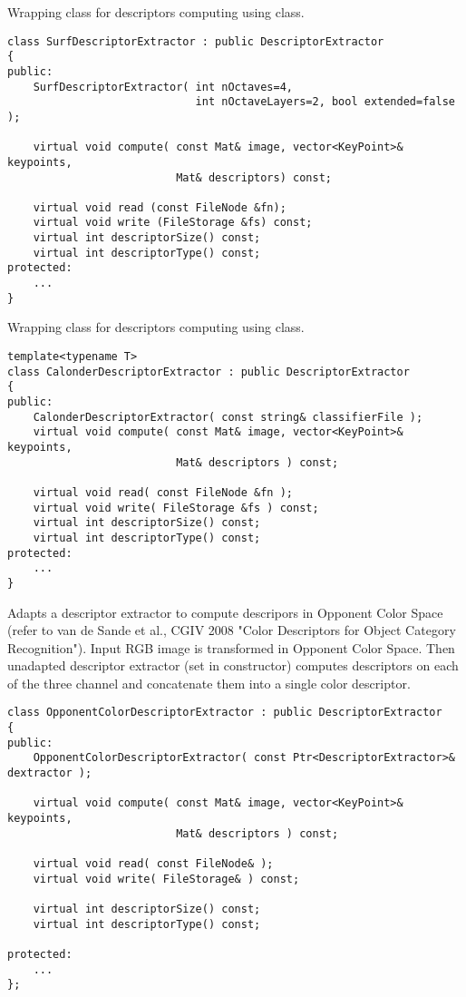 Wrapping class for descriptors computing using  class.

\begin{lstlisting}
class SurfDescriptorExtractor : public DescriptorExtractor
{
public:
    SurfDescriptorExtractor( int nOctaves=4,
                             int nOctaveLayers=2, bool extended=false );

    virtual void compute( const Mat& image, vector<KeyPoint>& keypoints, 
                          Mat& descriptors) const;

    virtual void read (const FileNode &fn);
    virtual void write (FileStorage &fs) const;
    virtual int descriptorSize() const;
    virtual int descriptorType() const;
protected:
    ...
}
\end{lstlisting}

Wrapping class for descriptors computing using  class.

\begin{lstlisting}
template<typename T>
class CalonderDescriptorExtractor : public DescriptorExtractor
{
public:
    CalonderDescriptorExtractor( const string& classifierFile );
    virtual void compute( const Mat& image, vector<KeyPoint>& keypoints, 
                          Mat& descriptors ) const;
    
    virtual void read( const FileNode &fn );
    virtual void write( FileStorage &fs ) const;
    virtual int descriptorSize() const;
    virtual int descriptorType() const;
protected:
    ...
}
\end{lstlisting}

Adapts a descriptor extractor to compute descripors in Opponent Color Space
(refer to van de Sande et al., CGIV 2008 "Color Descriptors for Object Category Recognition").
Input RGB image is transformed in Opponent Color Space. Then unadapted descriptor extractor
(set in constructor) computes descriptors on each of the three channel and concatenate
them into a single color descriptor.

\begin{lstlisting}
class OpponentColorDescriptorExtractor : public DescriptorExtractor
{
public:
    OpponentColorDescriptorExtractor( const Ptr<DescriptorExtractor>& dextractor );

    virtual void compute( const Mat& image, vector<KeyPoint>& keypoints, 
                          Mat& descriptors ) const;

    virtual void read( const FileNode& );
    virtual void write( FileStorage& ) const;

    virtual int descriptorSize() const;
    virtual int descriptorType() const;

protected:
    ...
};
\end{lstlisting}

